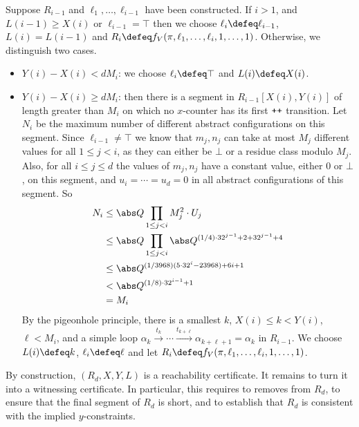 Suppose $R_{i-1}$ and $\ell_1,\ldots,\ell_{i-1}$ have been
constructed. If $i>1$, and $L(i-1)\ge X(i)$ or $\ell_{i-1} = \top$
then we choose $\ell_{i} \defeq \ell_{i-1}$, $L(i)=L(i-1)$ and
$R_i \defeq f_V(\pi,\ell_1,\ldots,\ell_{i},1,\ldots,1)$. Otherwise, we
distinguish two cases.
%
\begin{itemize}
\item $Y(i)-X(i) < dM_i$: we choose $\ell_{i} \defeq \top$ and $L(i)\defeq X(i)$.
\item $Y(i)-X(i) \ge dM_i$: then there is a segment in $R_{i-1}[X(i),Y(i)]$ of length greater than $M_i$ on which no $x$-counter has its first ${\normalfont{\texttt{{++}}}}$ transition. Let $N_i$ be the maximum number of different abstract configurations on this segment. Since $\ell_{i-1}\neq\top$ we know that $m_j,n_j$ can take at most $M_j$ different values for all $1\le j<i$, as they can either be $\bot$ or a residue class modulo $M_j$. Also, for all $i\le j\le d$ the values of $m_j,n_j$ have a constant value, either 0 or $\bot$,
on this segment, and $u_i=\cdots=u_d=0$ in all abstract configurations
of this segment. So
%
\begin{align*}
  N_i \le{} & \abs Q \prod_{1\le j<i} M_j^2 \cdot U_j\\
  \le{} & \abs Q \prod_{1\le j<i} \abs Q^{(1/4)\cdot 32^{j-1} + 2 + 32^{j-1} + 4 }\\
  \le{} & \abs Q^{(1/3968)(5\cdot 32^i - 23968)+6i+1}\\
  <{} & \abs Q^{(1/8)\cdot 32^{i-1} + 1}\\
  ={} & M_i 
\end{align*}
%
By the pigeonhole principle, there is a smallest $k$, $X(i)\le k<
Y(i)$, $\ell < M_i $, and a simple loop
$\alpha_k \xrightarrow{t_k}\cdots \xrightarrow{t_{k+\ell}}\alpha_{k+\ell+1}=\alpha_k$
in $R_{i-1}$. We choose $L(i)\defeq k$, $\ell_i\defeq \ell$ and let
$R_i\defeq f_V(\pi,\ell_1,\ldots,\ell_{i},1,\ldots,1)$.
\end{itemize}
%
By construction, $(R_d,X,Y,L)$ is a reachability certificate. It
remains to turn it into a witnessing certificate. In particular, this
requires to removes from $R_d$, to ensure that the final segment of
$R_d$ is short, and to establish that $R_d$ is consistent with the
implied $y$-constraints.

